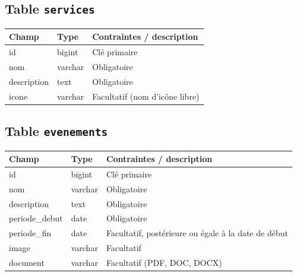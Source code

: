 \documentclass[11pt,a4paper]{report}
\begin{document}
\subsection*{Table \texttt{services}}
\begin{center}
\renewcommand{\arraystretch}{1.2}
\begin{tabular}{L{2.6cm} L{2.6cm} L{7.8cm}}
\toprule
{}
\textbf{Champ} & \textbf{Type} & \textbf{Contraintes / description} \\
\midrule
id & bigint & Clé primaire \\
nom & varchar & Obligatoire \\
description & text & Obligatoire \\
icone & varchar & Facultatif (nom d'icône libre) \\
\bottomrule
\end{tabular}
\end{center}

\subsection*{Table \texttt{evenements}}
\begin{center}
\renewcommand{\arraystretch}{1.2}
\begin{tabular}{L{2.6cm} L{2.6cm} L{7.8cm}}
\toprule
{}
\textbf{Champ} & \textbf{Type} & \textbf{Contraintes / description} \\
\midrule
id & bigint & Clé primaire \\
nom & varchar & Obligatoire \\
description & text & Obligatoire \\
periode\_debut & date & Obligatoire \\
periode\_fin & date & Facultatif, postérieure ou égale à la date de début \\
image & varchar & Facultatif \\
document & varchar & Facultatif (PDF, DOC, DOCX) \\
\bottomrule
\end{tabular}
\end{center}
\end{document}
